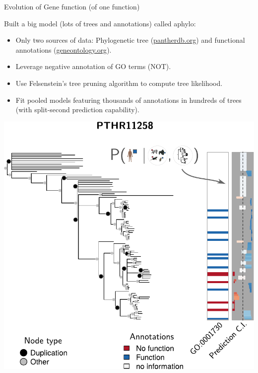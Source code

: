 \documentclass[10pt,aspectratio=169]{beamer}
\newcounter{frame}[frame]
\begin{document}
\begin{frame}{Evolution of Gene function (of one function)}

Built a big model (lots of trees and annotations) called aphylo:

\begin{center}
\begin{minipage}{.44\linewidth}
    \begin{itemize}[<+->]
        \item Only two sources of data: Phylogenetic tree (\url{pantherdb.org}) and functional annotations (\url{geneontology.org}).
        \item Leverage negative annotation of GO terms (NOT).
        \item Use Felsenstein's tree pruning algorithm to compute tree likelihood.
        \item Fit pooled models featuring thousands of annotations in hundreds of trees (with split-second prediction capability).
    \end{itemize}
\end{minipage}
\begin{minipage}{.55\linewidth}
    \includegraphics[width=.8\linewidth, clip, trim={0 0 0 1.5cm}]{example-trees-good1-parts-1b.pdf}
\end{minipage}
\end{center}

\vfil\hfill{}
  
\end{frame}
\end{document}
